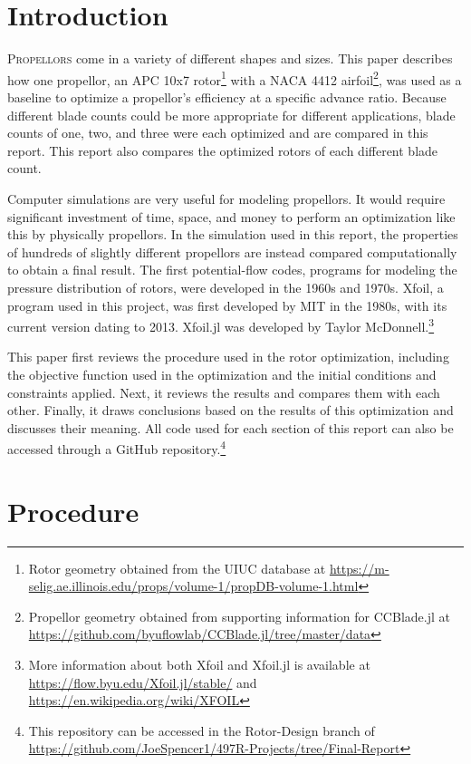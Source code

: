 \documentclass[journal ]{new-aiaa}
\begin{document}
\section{Introduction}

\lettrine{P}{ropellors} come in a variety of different shapes and sizes. This paper describes how one propellor, an APC 10x7 rotor\footnote{Rotor geometry obtained from the UIUC database at \url{https://m-selig.ae.illinois.edu/props/volume-1/propDB-volume-1.html}} with a NACA 4412 airfoil\footnote{Propellor geometry obtained from supporting information for CCBlade.jl at \url{https://github.com/byuflowlab/CCBlade.jl/tree/master/data}}, was used as a baseline to optimize a propellor's efficiency at a specific advance ratio. Because different blade counts could be more appropriate for different applications, blade counts of one, two, and three were each optimized and are compared in this report. This report also compares the optimized rotors of each different blade count.

Computer simulations are very useful for modeling propellors. It would require significant investment of time, space, and money to perform an optimization like this by physically propellors. In the simulation used in this report, the properties of hundreds of slightly different propellors are instead compared computationally to obtain a final result. The first potential-flow codes, programs for modeling the pressure distribution of rotors, were developed in the 1960s and 1970s. Xfoil, a program used in this project, was first developed by MIT in the 1980s, with its current version dating to 2013. Xfoil.jl was developed by Taylor McDonnell.\footnote{More information about both Xfoil and Xfoil.jl is available at \url{https://flow.byu.edu/Xfoil.jl/stable/} and \url{https://en.wikipedia.org/wiki/XFOIL}}

This paper first reviews the procedure used in the rotor optimization, including the objective function used in the optimization and the initial conditions and constraints applied. Next, it reviews the results and compares them with each other. Finally, it draws conclusions based on the results of this optimization and discusses their meaning. All code used for each section of this report can also be accessed through a GitHub repository.\footnote{This repository can be accessed in the Rotor-Design branch of \url{https://github.com/JoeSpencer1/497R-Projects/tree/Final-Report}}


\section{Procedure}
\end{document}
